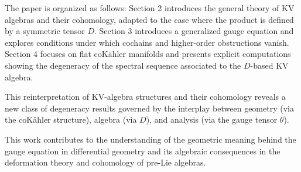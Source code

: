 The paper is organized as follows: Section 2 introduces the general theory of KV algebras and their cohomology, adapted to the case where the product is defined by a symmetric tensor $D$. Section 3 introduces a generalized gauge equation and explores conditions under which cochains and higher-order obstructions vanish. Section 4 focuses on flat coKähler manifolds and presents explicit computations showing the degeneracy of the spectral sequence associated to the $D$-based KV algebra.

This reinterpretation of KV-algebra structures and their cohomology reveals a new class of degeneracy results governed by the interplay between geometry (via the coKähler structure), algebra (via $D$), and analysis (via the gauge tensor $\theta$).

This work contributes to the understanding of the geometric meaning behind the gauge equation in differential geometry and its algebraic consequences in the deformation theory and cohomology of pre-Lie algebras.

